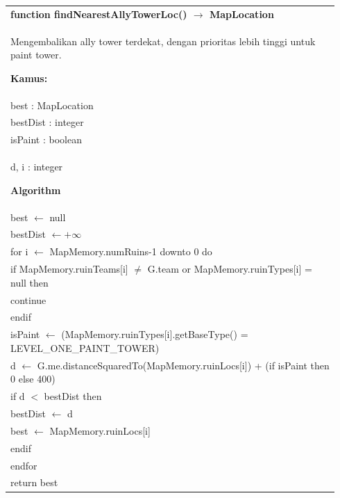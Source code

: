 \documentclass{article}
\newenvironment{pseudobox}
{
\centering
\begin{longtable}{|p{0.94\linewidth}|}
\hline
}
{
\\ \hline
\end{longtable}
\vspace{0.05cm}
}
\begin{document}
\begin{pseudobox}
\textbf{function findNearestAllyTowerLoc() $\rightarrow$ MapLocation} \\
{ Mengembalikan ally tower terdekat, dengan prioritas lebih tinggi untuk paint tower. }

\textbf{Kamus:} \\
\hspace*{1em} best : MapLocation \\
\hspace*{1em} bestDist : integer \\
\hspace*{1em} isPaint : boolean \\
\hspace*{1em} d, i : integer

\textbf{Algorithm} \\
\hspace*{1em} best $\leftarrow$ null \\
\hspace*{1em} bestDist $\leftarrow +\infty$ \\

\hspace*{1em} for i $\leftarrow$ MapMemory.numRuins-1 downto 0 do \\
\hspace*{2em} if MapMemory.ruinTeams[i] $\neq$ G.team or MapMemory.ruinTypes[i] = null then \\
\hspace*{3em} continue \\
\hspace*{2em} endif \\

\hspace*{2em} isPaint $\leftarrow$ (MapMemory.ruinTypes[i].getBaseType() = LEVEL\_ONE\_PAINT\_TOWER) \\
\hspace*{2em} d $\leftarrow$ G.me.distanceSquaredTo(MapMemory.ruinLocs[i]) + (if isPaint then 0 else 400) \\

\hspace*{2em} if d $<$ bestDist then \\
\hspace*{3em} bestDist $\leftarrow$ d \\
\hspace*{3em} best $\leftarrow$ MapMemory.ruinLocs[i] \\
\hspace*{2em} endif \\
\hspace*{1em} endfor \\

\hspace*{1em} return best
\end{pseudobox}
\end{document}
